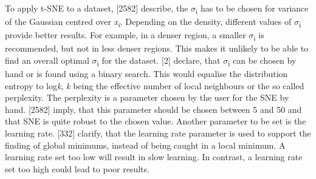 To apply t-SNE to a dataset, \textcite{maaten2008visualizing}[2582] describe, the $\sigma$\textsubscript{i} has to be chosen for variance of the Gaussian centred over \textit{x\textsubscript{i}}. Depending on the density, different values of $\sigma$\textsubscript{i} provide better results. For example, in a denser region, a smaller $\sigma$\textsubscript{i} is recommended, but not in less denser regions. This makes it unlikely to be able to find an overall optimal  $\sigma$\textsubscript{i} for the dataset. \textcite{hinton2003stochastic}[2] declare, that $\sigma$\textsubscript{i} can be chosen by hand or is found using a binary search. This would equalise the distribution entropy to log\textit{k}, \textit{k} being the effective number of local neighbours or the so called perplexity. The perplexity is a parameter chosen by the user for the SNE by hand. \textcite{maaten2008visualizing}[2582] imply, that this parameter should be chosen between 5 and 50 and that SNE is quite robust to the chosen value. 
Another parameter to be set is the learning rate. \textcite{han2011data}[332] clarify, that the learning rate parameter is used to support the finding of global minimums, instead of being caught in a local minimum. A learning rate set too low will result in slow learning. In contrast, a learning rate set too high could lead to poor results.

